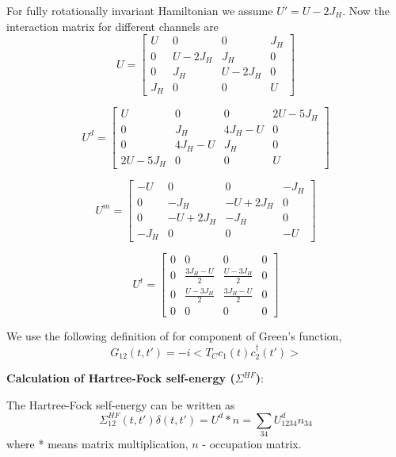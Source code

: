 For fully rotationally invariant Hamiltonian we assume $U' = U - 2 J_H$. Now the interaction matrix for different channels are
\[
 U =
 \begin{bmatrix}
  U & 0 & 0 & J_H \\
  0 & U-2J_H & J_H & 0 \\
  0 & J_H & U-2J_H & 0 \\
  J_H & 0 & 0 & U 
 \end{bmatrix}
\]


\[
 U^d =
 \begin{bmatrix}
  U & 0 & 0 & 2U-5J_H \\
  0 & J_H & 4J_H-U & 0 \\
  0 & 4J_H-U & J_H & 0 \\
  2U-5J_H & 0 & 0 & U 
 \end{bmatrix}
\]

\[
 U^m =
 \begin{bmatrix}
  -U & 0 & 0 & -J_H \\
  0 & -J_H & -U+2J_H & 0 \\
  0 & -U+2J_H & -J_H & 0 \\
  -J_H & 0 & 0 & -U
 \end{bmatrix}
\]


\[
 U^t =
 \begin{bmatrix}
  0 & 0 & 0 & 0 \\
  0 & \frac{3J_H-U}{2} & \frac{U-3J_H}{2} & 0 \\
  0 & \frac{U-3J_H}{2} & \frac{3J_H-U}{2} & 0 \\
  0 & 0 & 0 & 0
 \end{bmatrix}
\]



We use the following definition of for component of Green's function,
\begin{equation}
G_{12}(t,t') = -i <T_C c_1(t) c^{\dagger}_2(t')>
\end{equation}

\vspace*{0.2cm}
{\bf Calculation of Hartree-Fock self-energy ($\Sigma^{HF}$)}:

The Hartree-Fock self-energy can be written as 
\begin{equation}
\Sigma^{HF}_{12}(t,t') \delta(t,t') = U^d*n = \sum_{34} U^d_{1234}n_{34} 
\end{equation}
where * means matrix multiplication, $n$ - occupation matrix.


